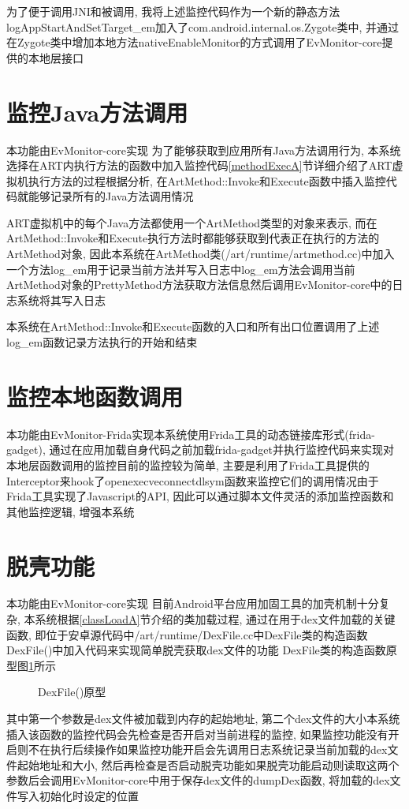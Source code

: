 为了便于调用JNI和被调用, 我将上述监控代码作为一个新的静态方法logAppStartAndSetTarget\_em加入了com.android.internal.os.Zygote类中, 并通过在Zygote类中增加本地方法nativeEnableMonitor的方式调用了EvMonitor-core提供的本地层接口\juhao 

\section{监控Java方法调用}
本功能由EvMonitor-core实现\juhao 
为了能够获取到应用所有Java方法调用行为, 本系统选择在ART内执行方法的函数中加入监控代码\juhao  \ref{methodExecA}节详细介绍了ART虚拟机执行方法的过程\juhao 根据分析, 在ArtMethod::Invoke和Execute函数中插入监控代码就能够记录所有的Java方法调用情况\juhao  

ART虚拟机中的每个Java方法都使用一个ArtMethod类型的对象来表示, 而在ArtMethod::Invoke和Execute执行方法时都能够获取到代表正在执行的方法的ArtMethod对象, 因此本系统在ArtMethod类(/art/runtime/artmethod.cc)中加入一个方法log\_em用于记录当前方法并写入日志中\juhao log\_em方法会调用当前ArtMethod对象的PrettyMethod方法获取方法信息然后调用EvMonitor-core中的日志系统将其写入日志\juhao 

本系统在ArtMethod::Invoke和Execute函数的入口和所有出口位置调用了上述log\_em函数记录方法执行的开始和结束\juhao 

\section{监控本地函数调用}
本功能由EvMonitor-Frida实现\juhao 本系统使用Frida工具的动态链接库形式(frida-gadget), 通过在应用加载自身代码之前加载frida-gadget并执行监控代码来实现对本地层函数调用的监控\juhao 目前的监控较为简单, 主要是利用了Frida工具提供的Interceptor来hook了open\dunhao execve\dunhao connect\dunhao dlsym函数来监控它们的调用情况\juhao 由于Frida工具实现了Javascript的API, 因此可以通过脚本文件灵活的添加监控函数和其他监控逻辑, 增强本系统\juhao 


\section{脱壳功能}
本功能由EvMonitor-core实现\juhao 
目前Android平台应用加固工具的加壳机制十分复杂, 本系统根据\ref{classLoadA}节介绍的类加载过程, 通过在用于dex文件加载的关键函数, 即位于安卓源代码中/art/runtime/DexFile.cc中DexFile类的构造函数DexFile()中加入代码来实现简单脱壳获取dex文件的功能\juhao 
DexFile类的构造函数原型图\ref{dexFileCode}所示\juhao 
\begin{figure}[ht]
	\centering
	\caption{DexFile()原型}
	\label{dexFileCode}
\end{figure}
其中第一个参数是dex文件被加载到内存的起始地址, 第二个dex文件的大小\juhao 本系统插入该函数的监控代码会先检查是否开启对当前进程的监控, 如果监控功能没有开启则不在执行后续操作\juhao 如果监控功能开启会先调用日志系统记录当前加载的dex文件起始地址和大小, 然后再检查是否启动脱壳功能\juhao 如果脱壳功能启动则读取这两个参数后会调用EvMonitor-core中用于保存dex文件的dumpDex函数, 将加载的dex文件写入初始化时设定的位置\juhao 


